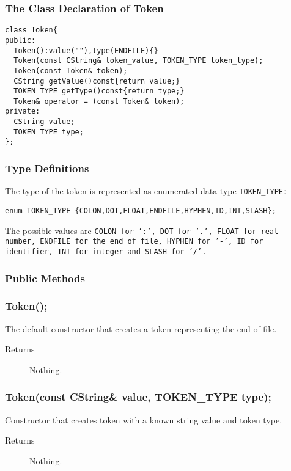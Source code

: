 \subsubsection{The Class Declaration of Token}
\begin{verbatim}
class Token{
public:
  Token():value(""),type(ENDFILE){}
  Token(const CString& token_value, TOKEN_TYPE token_type);
  Token(const Token& token);
  CString getValue()const{return value;}
  TOKEN_TYPE getType()const{return type;}
  Token& operator = (const Token& token);
private:
  CString value;
  TOKEN_TYPE type;
};
\end{verbatim}

\subsubsection{Type Definitions}
The type of the token is represented as enumerated data type 
\tt TOKEN\_TYPE\rm:

\begin{center}
\tt enum TOKEN\_TYPE \{COLON,DOT,FLOAT,ENDFILE,HYPHEN,ID,INT,SLASH\}; 
\rm
\end{center}

The possible values are \tt COLON \rm for ':', \tt DOT \rm for '.', 
\tt FLOAT \rm for real number, \tt ENDFILE \rm for the end of file, 
\tt HYPHEN \rm for '-', \tt ID \rm for identifier, \tt INT \rm for
integer and \tt SLASH \rm for '/'.

\subsubsection{Public Methods}

\subsubsection{Token();}
The default constructor that creates a token representing the
end of file.
\begin{description}
  \item [Returns] Nothing.
\end{description}

\subsubsection{Token(const CString\& value, TOKEN\_TYPE type);}
Constructor that creates token with a known string value and token type.
\begin{description}
  \item [Returns] Nothing.
\end{description}


